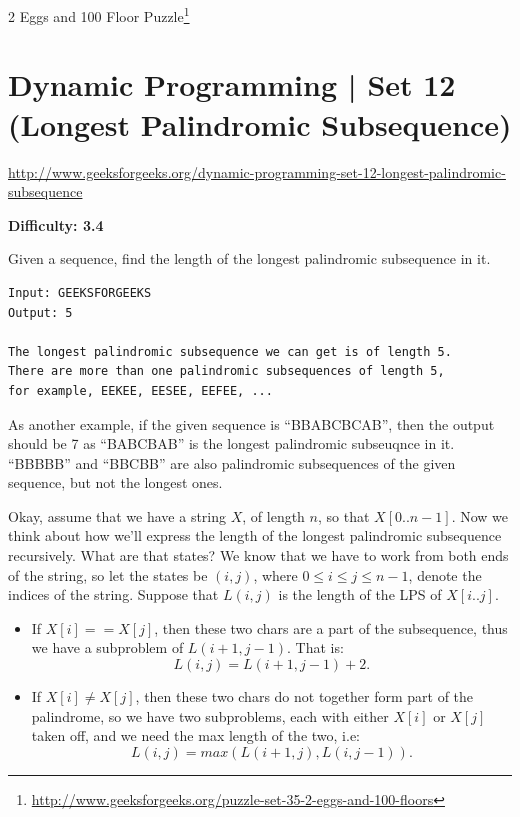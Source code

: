 2 Eggs and 100 Floor
Puzzle\footnote{\url{http://www.geeksforgeeks.org/puzzle-set-35-2-eggs-and-100-floors}}


\section{Dynamic Programming | Set 12 (Longest Palindromic Subsequence)
  \label{secGFGDPSet12LongPalinSubseq}}

\url{http://www.geeksforgeeks.org/dynamic-programming-set-12-longest-palindromic-subsequence}

\textbf{Difficulty: 3.4}

Given a sequence, find the length of the longest palindromic subsequence in
it.
\begin{lstlisting}[style=raygeneric]
Input: GEEKSFORGEEKS
Output: 5

The longest palindromic subsequence we can get is of length 5.
There are more than one palindromic subsequences of length 5,
for example, EEKEE, EESEE, EEFEE, ...
\end{lstlisting}
As another example, if the given sequence is ``BBABCBCAB'', then the output
should be 7 as ``BABCBAB'' is the longest palindromic subseuqnce in it.
``BBBBB'' and ``BBCBB'' are also palindromic subsequences of the given
sequence, but not the longest ones.

\textbf{}

\RayNotesBegin

Okay, assume that we have a string $X$, of length $n$, so that $X[0..n-1]$.
Now we think about how we'll express the length of the longest palindromic
subsequence recursively. What are that states? We know that we have to work
from both ends of the string, so let the states be $(i,j)$, where $0\leq
i\leq j\leq n-1$,
denote the indices of the string. Suppose that $L(i,j)$ is the length of the
LPS of $X[i..j]$.
\begin{itemize}%
\item If $X[i]==X[j]$, then these two chars are a part of the subsequence,
  thus we have a subproblem of $L(i+1,j-1)$. That is: 
  \begin{equation*}
  L(i,j)=L(i+1,j-1)+2.
  \end{equation*}
\item If $X[i]\neq X[j]$, then these two chars do not together form part of
  the palindrome, so we have two subproblems, each with either $X[i]$ or
  $X[j]$ taken off, and we need the max length of the two, i.e:
  \begin{equation*}
  L(i,j)=max(L(i+1,j),L(i,j-1)).
  \end{equation*}
\end{itemize}

